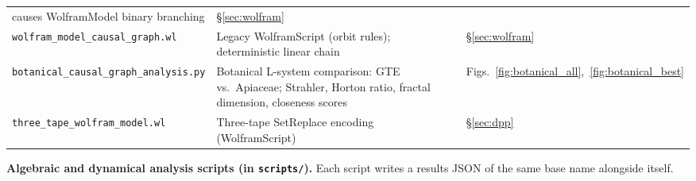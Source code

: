 \documentclass[11pt]{article}
\theoremstyle{remark}
\begin{document}
\begin{appendices}
\begin{center}
\begin{tabular}{@{}p{5.8cm}p{4.6cm}p{2.6cm}@{}}
    causes WolframModel binary branching
  & §\ref{sec:wolfram} \\
\texttt{wolfram\_model\_causal\_graph.wl}
  & Legacy WolframScript (orbit rules); deterministic linear chain
  & §\ref{sec:wolfram} \\
\texttt{botanical\_causal\_graph\_analysis.py}
  & Botanical L-system comparison: GTE vs.\ Apiaceae; Strahler,
    Horton ratio, fractal dimension, closeness scores
  & Figs.~\ref{fig:botanical_all},~\ref{fig:botanical_best} \\
\texttt{three\_tape\_wolfram\_model.wl}
  & Three-tape SetReplace encoding (WolframScript)
  & §\ref{sec:dpp} \\
\bottomrule
\end{tabular}
\end{center}

\noindent\textbf{Algebraic and dynamical analysis scripts (in
\texttt{scripts/}).} Each script writes a results JSON of the same base
name alongside itself.


\end{appendices}
\end{document}

